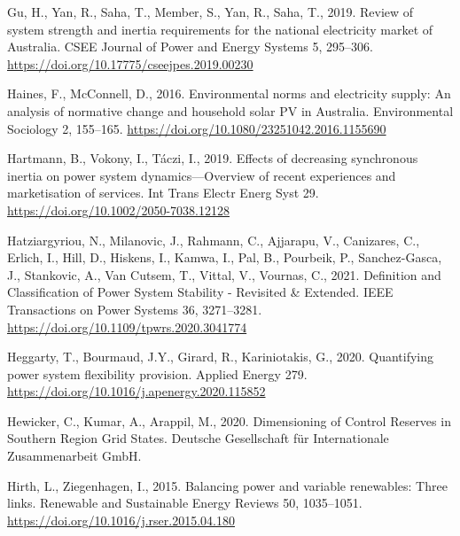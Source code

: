 \documentclass[12pt,a4paper,]{report}
\newlength{\cslhangindent}
\newenvironment{CSLReferences}[2] %
 {%
  \setlength{\parindent}{0pt}
  \ifodd #1 \everypar{\setlength{\hangindent}{\cslhangindent}}\ignorespaces\fi
  \ifnum #2 > 0
  \setlength{\parskip}{#2\baselineskip}
  \fi
 }%
 {}
\begin{document}
\begin{CSLReferences}{1}{0}
\leavevmode{}%
Gu, H., Yan, R., Saha, T., Member, S., Yan, R., Saha, T., 2019. Review
of system strength and inertia requirements for the national electricity
market of {Australia}. CSEE Journal of Power and Energy Systems 5,
295--306. \url{https://doi.org/10.17775/cseejpes.2019.00230}

\leavevmode{}%
Haines, F., McConnell, D., 2016. Environmental norms and electricity
supply: An analysis of normative change and household solar {PV} in
{Australia}. Environmental Sociology 2, 155--165.
\url{https://doi.org/10.1080/23251042.2016.1155690}

\leavevmode{}%
Hartmann, B., Vokony, I., Táczi, I., 2019. Effects of decreasing
synchronous inertia on power system dynamics---{Overview} of recent
experiences and marketisation of services. Int Trans Electr Energ Syst
29. \url{https://doi.org/10.1002/2050-7038.12128}

\leavevmode{}%
Hatziargyriou, N., Milanovic, J., Rahmann, C., Ajjarapu, V., Canizares,
C., Erlich, I., Hill, D., Hiskens, I., Kamwa, I., Pal, B., Pourbeik, P.,
Sanchez-Gasca, J., Stankovic, A., Van Cutsem, T., Vittal, V., Vournas,
C., 2021. Definition and {Classification} of {Power System Stability} -
{Revisited} \& {Extended}. IEEE Transactions on Power Systems 36,
3271--3281. \url{https://doi.org/10.1109/tpwrs.2020.3041774}

\leavevmode{}%
Heggarty, T., Bourmaud, J.Y., Girard, R., Kariniotakis, G., 2020.
Quantifying power system flexibility provision. Applied Energy 279.
\url{https://doi.org/10.1016/j.apenergy.2020.115852}

\leavevmode{}%
Hewicker, C., Kumar, A., Arappil, M., 2020. Dimensioning of {Control
Reserves} in {Southern Region Grid States}. {Deutsche Gesellschaft für
Internationale Zusammenarbeit GmbH}.

\leavevmode{}%
Hirth, L., Ziegenhagen, I., 2015. Balancing power and variable
renewables: {Three} links. Renewable and Sustainable Energy Reviews 50,
1035--1051. \url{https://doi.org/10.1016/j.rser.2015.04.180}


\end{CSLReferences}
\end{document}
